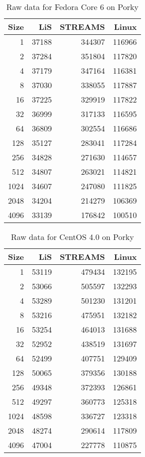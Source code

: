 \documentclass[letterpaper,final,notitlepage,twocolumn,10pt,twoside]{article}
\let\normalsize = \small
\let\small = \footnotesize
\let\footnotesize = \scriptsize
\let\scriptsize = \tiny
\begin{document}
\begin{appendix}
\begin{table}[h]
\footnotesize
\setlength{\tabcolsep}{0.3em}
\setlength{\arraycolsep}{0.3em}
\begin{center}
\begin{tabular}{rrrr}\\
\hline
Size & LiS & STREAMS & Linux\\
\hline
\hline
1 & 37188 & 344307 & 116966\\
2 & 37284 & 351804 & 117820\\
4 & 37179 & 347164 & 116381\\
8 & 37030 & 338055 & 117887\\
16 & 37225 & 329919 & 117822\\
32 & 36999 & 317133 & 116595\\
64 & 36809 & 302554 & 116686\\
128 & 35127 & 283041 & 117284\\
256 & 34828 & 271630 & 114657\\
512 & 34807 & 263021 & 114821\\
1024 & 34607 & 247080 & 111825\\
2048 & 34204 & 214279 & 106369\\
4096 & 33139 & 176842 & 100510\\
\hline
\end{tabular}
\end{center}
\caption{Raw data for Fedora Core 6 on Porky}
\label{table:fc6data}
\normalsize
\end{table}

\begin{table}[h]
\footnotesize
\setlength{\tabcolsep}{0.3em}
\setlength{\arraycolsep}{0.3em}
\begin{center}
\begin{tabular}{rrrr}\\
\hline
Size & LiS & STREAMS & Linux\\
\hline
\hline
1 & 53119 & 479434 & 132195\\
2 & 53066 & 505597 & 132293\\
4 & 53289 & 501230 & 131201\\
8 & 53216 & 475951 & 132182\\
16 & 53254 & 464013 & 131688\\
32 & 52952 & 438519 & 131697\\
64 & 52499 & 407751 & 129409\\
128 & 50065 & 379356 & 130188\\
256 & 49348 & 372393 & 126861\\
512 & 49297 & 360773 & 125318\\
1024 & 48598 & 336727 & 123318\\
2048 & 48274 & 290614 & 117809\\
4096 & 47004 & 227778 & 110875\\
\hline
\end{tabular}
\end{center}
\caption{Raw data for CentOS 4.0 on Porky}
\label{table:centosdata}
\normalsize
\end{table}


\end{appendix}
\end{document}
